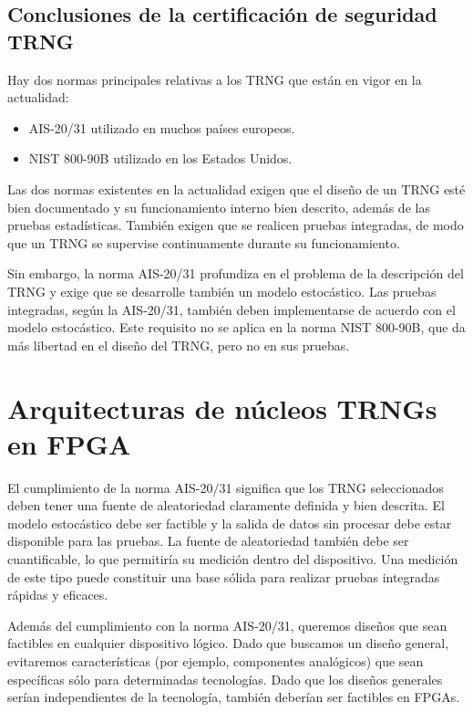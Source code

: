 		\subsection{Conclusiones de la certificación de seguridad TRNG}
		
            Hay dos normas principales relativas a los TRNG que están en vigor en la actualidad:
            
            \begin{itemize}[noitemsep]
                \item AIS-20/31 utilizado en muchos países europeos. \cite{AIS2011}
                \item NIST 800-90B utilizado en los Estados Unidos. \cite{Turan2018}
            \end{itemize}
        
            Las dos normas existentes en la actualidad exigen que el diseño de un TRNG esté bien documentado y su funcionamiento interno bien descrito, además de las pruebas estadísticas. También exigen que se realicen pruebas integradas, de modo que un TRNG se supervise continuamente durante su funcionamiento.
        
            Sin embargo, la norma AIS-20/31 profundiza en el problema de la descripción del TRNG y exige que se desarrolle también un modelo estocástico. Las pruebas integradas, según la AIS-20/31, también deben implementarse de acuerdo con el modelo estocástico. Este requisito no se aplica en la norma NIST 800-90B, que da más libertad en el diseño del TRNG, pero no en sus pruebas.

    
    \section{Arquitecturas de núcleos TRNGs en FPGA}

        El cumplimiento de la norma AIS-20/31 significa que los TRNG seleccionados deben tener una fuente de aleatoriedad claramente definida y bien descrita. El modelo estocástico debe ser factible y la salida de datos sin procesar debe estar disponible para las pruebas. La fuente de aleatoriedad también debe ser cuantificable, lo que permitiría su medición dentro del dispositivo. Una medición de este tipo puede constituir una base sólida para realizar pruebas integradas rápidas y eficaces.

        Además del cumplimiento con la norma AIS-20/31, queremos diseños que sean factibles en cualquier dispositivo lógico. Dado que buscamos un diseño general, evitaremos características (por ejemplo, componentes analógicos) que sean específicas sólo para determinadas tecnologías. Dado que los diseños generales serían independientes de la tecnología, también deberían ser factibles en FPGAs.

